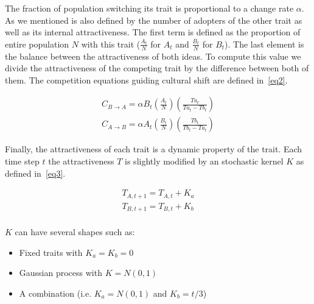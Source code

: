 \documentclass[12pt]{article}
\begin{document}
The fraction of population switching its trait is proportional to a change rate $\alpha$. As we mentioned is also defined by the number of adopters of the other trait as well as its internal attractiveness. The first term is defined as the proportion of entire population $N$ with this trait ($\frac{A_t}{N}$ for $A_t$ and $\frac{B_t}{N}$ for $B_t$). The last element is the balance between the attractiveness of both ideas. To compute this value we divide the attractiveness of the competing trait by the difference between both of them. The competition equations guiding cultural shift are defined in~\ref{eq2}.

\begin{equation}
\begin{split}
C_{B \to A} = \alpha B_t \left(\frac{A_t}{N}\right) \left(\frac{Ta_t}{Ta_t-Tb_t}\right) \\
C_{A \to B} = \alpha A_t \left(\frac{B_t}{N}\right) \left(\frac{Tb_t}{Tb_t-Ta_t}\right)
\end{split}
\label{eq2}
\end{equation}

Finally, the attractiveness of each trait is a dynamic property of the trait. Each time step $t$ the attractiveness $T$ is slightly modified by an stochastic kernel $K$ as defined in~\ref{eq3}.

\begin{equation}
\begin{split}
T_{A,t+1} = T_{A,t} + K_a \\
T_{B,t+1} = T_{B,t} + K_b \\
\end{split}
\label{eq3}
\end{equation}

$K$ can have several shapes such as:
\begin{itemize}
\item Fixed traits with $K_a=K_b=0$
\item Gaussian process with $K=N(0,1)$
\item A combination (i.e. $K_a=N(0,1)$ and $K_b=t/3$)
\end{itemize}
\end{document}
